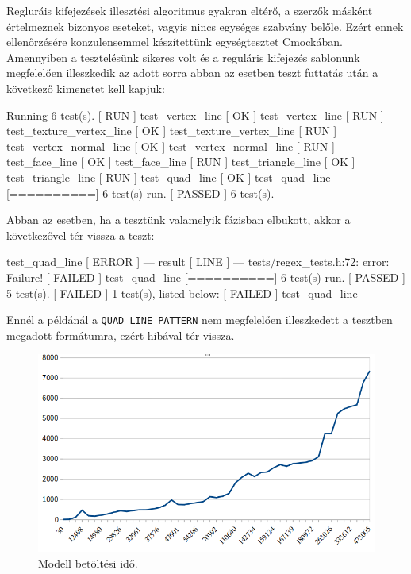 

Regluráis kifejezések illesztési algoritmus gyakran eltérő, a szerzők másként értelmeznek bizonyos eseteket, vagyis nincs egységes szabvány belőle.
Ezért ennek ellenőrzésére konzulensemmel készítettünk egységtesztet Cmockában. Amennyiben a tesztelésünk sikeres volt és a reguláris kifejezés sablonunk megfelelően illeszkedik az adott sorra abban az esetben teszt futtatás után a következő kimenetet kell kapjuk:
\begin{python}
[==========] Running 6 test(s).
[ RUN      ] test_vertex_line
[       OK ] test_vertex_line
[ RUN      ] test_texture_vertex_line
[       OK ] test_texture_vertex_line
[ RUN      ] test_vertex_normal_line
[       OK ] test_vertex_normal_line
[ RUN      ] test_face_line
[       OK ] test_face_line
[ RUN      ] test_triangle_line
[       OK ] test_triangle_line
[ RUN      ] test_quad_line
[       OK ] test_quad_line
[==========] 6 test(s) run.
[  PASSED  ] 6 test(s).
\end{python}
\noindent Abban az esetben, ha a tesztünk valamelyik fázisban elbukott, akkor a következővel tér vissza a teszt:
\begin{python}
[ RUN      ] test_quad_line
[  ERROR   ] --- result
[   LINE   ] --- tests/regex_tests.h:72: error: Failure!
[  FAILED  ] test_quad_line
[==========] 6 test(s) run.
[  PASSED  ] 5 test(s).
[  FAILED  ] 1 test(s), listed below:
[  FAILED  ] test_quad_line
\end{python}
Ennél a példánál a \texttt{QUAD\_LINE\_PATTERN} nem megfelelően illeszkedett  a tesztben megadott formátumra, ezért hibával tér vissza.

\begin{figure}[h]
\centering
\includegraphics[width=\textwidth]{images/betoltesiido.png}
\caption{Modell betöltési idő.}
\label{fig:betolt}
\end{figure}

